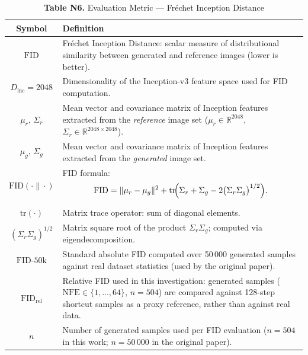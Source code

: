 \begin{table}[h]
\centering
\caption*{\textbf{Table N6.} Evaluation Metric — Fréchet Inception Distance}
\begin{tabular}{@{} c p{10cm} @{}}
\toprule
\textbf{Symbol} & \textbf{Definition} \\
\midrule
$\mathrm{FID}$
  & Fréchet Inception Distance: scalar measure of distributional
    similarity between generated and reference images
    (lower is better). \\
$D_{\mathrm{inc}} = 2048$
  & Dimensionality of the Inception-v3 feature space used for FID
    computation. \\
$\mu_r,\,\Sigma_r$
  & Mean vector and covariance matrix of Inception features extracted
    from the \emph{reference} image set
    ($\mu_r \in \mathbb{R}^{2048}$,\
     $\Sigma_r \in \mathbb{R}^{2048 \times 2048}$). \\
$\mu_g,\,\Sigma_g$
  & Mean vector and covariance matrix of Inception features extracted
    from the \emph{generated} image set. \\
$\mathrm{FID}(\cdot\|\cdot)$
  & FID formula:
    \[
      \mathrm{FID}
        = \|\mu_r - \mu_g\|^2
          + \mathrm{tr}\!\Bigl(
              \Sigma_r + \Sigma_g
              - 2\bigl(\Sigma_r\Sigma_g\bigr)^{1/2}
            \Bigr).
    \] \\
$\mathrm{tr}(\cdot)$
  & Matrix trace operator: sum of diagonal elements. \\
$(\Sigma_r\Sigma_g)^{1/2}$
  & Matrix square root of the product $\Sigma_r\Sigma_g$;
    computed via eigendecomposition. \\
$\mathrm{FID}\text{-}50\mathrm{k}$
  & Standard absolute FID computed over 50\,000 generated samples
    against real dataset statistics (used by the original paper). \\
$\mathrm{FID}_{\mathrm{rel}}$
  & Relative FID used in this investigation: generated samples
    ($\mathrm{NFE} \in \{1,\ldots,64\}$, $n=504$) are compared
    against 128-step shortcut samples as a proxy reference,
    rather than against real data. \\
$n$
  & Number of generated samples used per FID evaluation
    ($n = 504$ in this work; $n = 50\,000$ in the original paper). \\
\bottomrule
\end{tabular}
\end{table}

\renewcommand{\arraystretch}{1}  %
